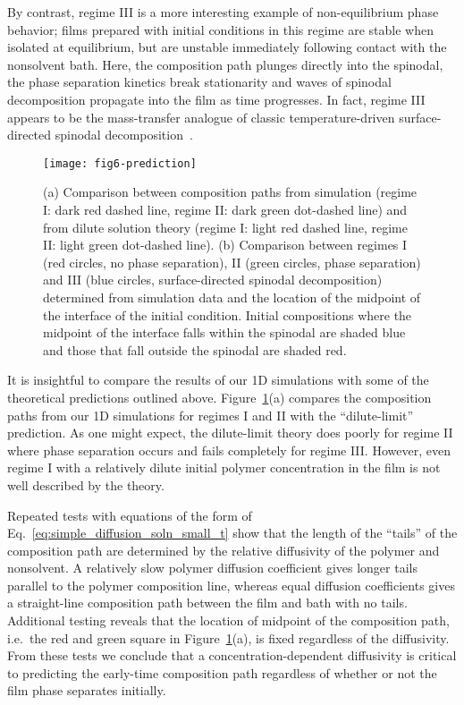 \documentclass[journal=mamobx, layout=twocolumn]{achemso}
\begin{document}
By contrast, regime III is a more interesting example of non-equilibrium phase behavior;
films prepared with initial conditions in this regime are stable when isolated at equilibrium, but are unstable immediately following contact with the nonsolvent bath.
Here, the composition path plunges directly into the spinodal, the phase separation kinetics break stationarity and waves of spinodal decomposition propagate into the film as time progresses.
In fact, regime III appears to be the mass-transfer analogue of classic temperature-driven surface-directed spinodal decomposition~\cite{Ball1990}.

\begin{figure}[t]
  \texttt{[image: fig6-prediction]}
  \caption{(a) Comparison between composition paths from simulation (regime I: dark red dashed line, regime II: dark green dot-dashed line) and from dilute solution theory (regime I: light red dashed line, regime II: light green dot-dashed line).
(b) Comparison between regimes I (red circles, no phase separation), II (green circles, phase separation) and III  (blue circles, surface-directed spinodal decomposition) determined from simulation data and the location of the midpoint of the interface of the initial condition. 
Initial compositions where the midpoint of the interface falls within the spinodal are shaded blue and those that fall outside the spinodal are shaded red.
}
  \label{fig-prediction}
\end{figure}

It is insightful to compare the results of our 1D simulations with some of the theoretical predictions outlined above.
Figure~\ref{fig-prediction}(a) compares the composition paths from our 1D simulations for regimes I and II with the ``dilute-limit'' prediction.
As one might expect, the dilute-limit theory does poorly for regime II where phase separation occurs and fails completely for regime III.
However, even regime I with a relatively dilute initial polymer concentration in the film is not well described by the theory.

Repeated tests with equations of the form of Eq.~\ref{eq:simple_diffusion_soln_small_t} show that the length of the ``tails'' of the composition path are determined by the relative diffusivity of the polymer and nonsolvent.
A relatively slow polymer diffusion coefficient gives longer tails parallel to the polymer composition line, whereas equal diffusion coefficients gives a straight-line composition path between the film and bath with no tails.
Additional testing reveals that the location of midpoint of the composition path, i.e.\ the red and green square in Figure~\ref{fig-prediction}(a), is fixed regardless of the diffusivity.
From these tests we conclude that a concentration-dependent diffusivity is critical to predicting the early-time composition path regardless of whether or not the film phase separates initially.
\end{document}
